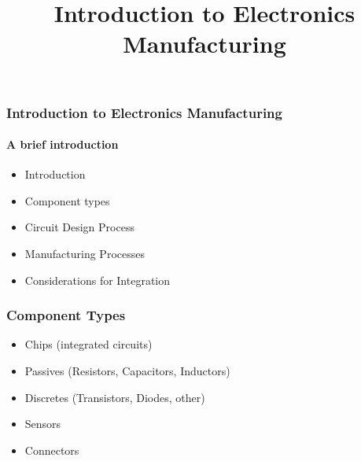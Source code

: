 \documentclass[12pt]{beamer}
\begin{document}
\date{}





\title{Introduction to Electronics Manufacturing}

\newcommand{\spage}[1]{
\begin{frame}
  \begin{tikzpicture}[remember picture, overlay]
  \node[anchor=north]at(current page.north){
     \texttt{[image: \#1]}
  };
  \end{tikzpicture}
\end{frame}
}
 
\frame{\titlepage}

\begin{frame}
\frametitle{Introduction to Electronics Manufacturing}
\framesubtitle{A brief introduction}

  \begin{itemize}
  \item Introduction
  \item Component types
  \item Circuit Design Process
  \item Manufacturing Processes
  \item Considerations for Integration
  \end{itemize}

\end{frame}


\begin{frame}
\frametitle{Component Types}

  \begin{itemize}
  \item Chips (integrated circuits)
  \item Passives (Resistors, Capacitors, Inductors)
  \item Discretes (Transistors, Diodes, other)
  \item Sensors
  \item Connectors
  \end{itemize}

\end{frame}
\end{document}
